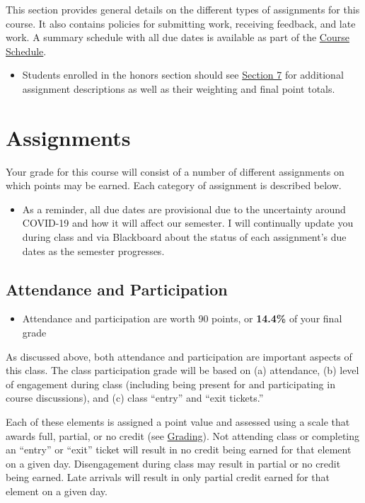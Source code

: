 \documentclass[
]{book}
\newenvironment{rmdblock}[1]
  {\begin{shaded*}
  \begin{itemize}
  \renewcommand{\labelitemi}{
    \raisebox{-.7\height}[0pt][0pt]{
      {\setkeys{Gin}{width=3em,keepaspectratio}\texttt{[image: images/\#1]}}
    }
  }
  \item
  }
  {
  \end{itemize}
  \end{shaded*}
  }
\newenvironment{rmdtip}
  {\begin{rmdblock}{tip}}
  {\end{rmdblock}}
\newenvironment{rmdwarning}
  {\begin{rmdblock}{warning}}
  {\end{rmdblock}}
\begin{document}
This section provides general details on the different types of assignments for this course. It also contains policies for submitting work, receiving feedback, and late work. A summary schedule with all due dates is available as part of the \href{course-schedule.html}{Course Schedule}.

\begin{rmdwarning}
Students enrolled in the honors section should see
\href{/syllabus/honors-overview.html}{Section 7} for additional
assignment descriptions as well as their weighting and final point
totals.
\end{rmdwarning}

\hypertarget{assignments}{%
\section{Assignments}\label{assignments}}

Your grade for this course will consist of a number of different assignments on which points may be earned. Each category of assignment is described below.

\begin{rmdwarning}
As a reminder, all due dates are provisional due to the uncertainty
around COVID-19 and how it will affect our semester. I will continually
update you during class and via Blackboard about the status of each
assignment's due dates as the semester progresses.
\end{rmdwarning}

\hypertarget{attendance-and-participation}{%
\subsection{Attendance and Participation}\label{attendance-and-participation}}

\begin{rmdtip}
Attendance and participation are worth 90 points, or \textbf{14.4\%} of
your final grade
\end{rmdtip}

As discussed above, both attendance and participation are important aspects of this class. The class participation grade will be based on (a) attendance, (b) level of engagement during class (including being present for and participating in course discussions), and (c) class ``entry'' and ``exit tickets.''

Each of these elements is assigned a point value and assessed using a scale that awards full, partial, or no credit (see \href{grading.html}{Grading}). Not attending class or completing an ``entry'' or ``exit'' ticket will result in no credit being earned for that element on a given day. Disengagement during class may result in partial or no credit being earned. Late arrivals will result in only partial credit earned for that element on a given day.
\end{document}
